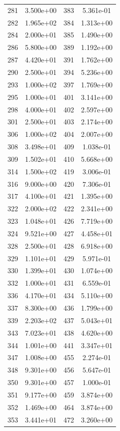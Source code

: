 \documentclass[12pt]{article}
\begin{document}
\begin{longtable}{@{}cccc@{}}
281 & 3.500e+00 & 383 & 5.361e-01 \\
282 & 1.965e+02 & 384 & 1.313e+00 \\
284 & 2.000e+01 & 385 & 1.490e+00 \\
286 & 5.800e+00 & 389 & 1.192e+00 \\
287 & 4.420e+01 & 391 & 1.762e+00 \\
290 & 2.500e+01 & 394 & 5.236e+00 \\
293 & 1.000e+02 & 397 & 1.769e+00 \\
295 & 1.000e+01 & 401 & 3.141e+00 \\
298 & 4.000e+01 & 402 & 2.597e+00 \\
301 & 2.500e+01 & 403 & 2.174e+00 \\
306 & 1.000e+02 & 404 & 2.007e+00 \\
308 & 3.498e+01 & 409 & 1.038e-01 \\
309 & 1.502e+01 & 410 & 5.668e+00 \\
314 & 1.500e+02 & 419 & 3.006e-01 \\
316 & 9.000e+00 & 420 & 7.306e-01 \\
317 & 4.100e+01 & 421 & 1.395e+00 \\
322 & 2.000e+02 & 422 & 2.341e+00 \\
323 & 1.048e+01 & 426 & 7.719e+00 \\
324 & 9.521e+00 & 427 & 4.458e+01 \\
328 & 2.500e+01 & 428 & 6.918e+00 \\
329 & 1.101e+01 & 429 & 5.971e-01 \\
330 & 1.399e+01 & 430 & 1.074e+00 \\
332 & 1.000e+01 & 431 & 6.559e-01 \\
336 & 4.170e+01 & 434 & 5.110e+00 \\
337 & 8.300e+00 & 436 & 1.799e+00 \\
339 & 2.203e+02 & 437 & 5.043e+01 \\
343 & 7.023e+01 & 438 & 4.620e+00 \\
344 & 1.001e+00 & 441 & 3.347e+01 \\
347 & 1.008e+00 & 455 & 2.274e-01 \\
348 & 9.301e+00 & 456 & 5.647e-01 \\
350 & 9.301e+00 & 457 & 1.000e-01 \\
351 & 9.177e+00 & 459 & 3.874e+00 \\
352 & 1.469e+00 & 464 & 3.874e+00 \\
353 & 3.441e+01 & 472 & 3.260e+00 \\

\end{longtable}
\end{document}
